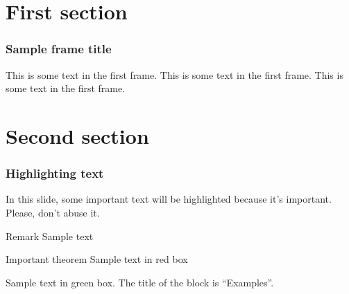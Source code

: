 \documentclass{beamer}
\begin{document}
\section{First section}

\begin{frame}
    \frametitle{Sample frame title}
    This is some text in the first frame. This is some text in the first frame. This is some text in the first frame.
\end{frame}

\section{Second section}

\begin{frame}
    \frametitle{Highlighting text}

    In this slide, some important text will be
    \alert{highlighted} because it's important.
    Please, don't abuse it.

    \begin{block}{Remark}
        Sample text
    \end{block}

    \begin{alertblock}{Important theorem}
        Sample text in red box
    \end{alertblock}

    \begin{examples}
        Sample text in green box. The title of the block is ``Examples''.
    \end{examples}
\end{frame}
\end{document}
